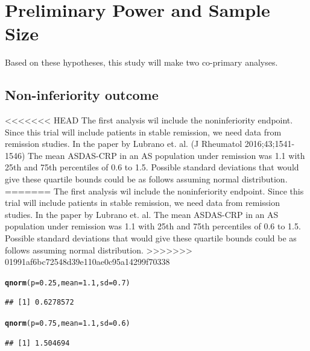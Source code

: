 \documentclass{article}\usepackage[]{graphicx}\usepackage[]{color}
\makeatletter
\newcommand{\hlnum}[1]{\textcolor[rgb]{0.686,0.059,0.569}{#1}}%
\newcommand{\hlstd}[1]{\textcolor[rgb]{0.345,0.345,0.345}{#1}}%
\newcommand{\hlkwc}[1]{\textcolor[rgb]{0.333,0.667,0.333}{#1}}%
\newcommand{\hlkwd}[1]{\textcolor[rgb]{0.737,0.353,0.396}{\textbf{#1}}}%
\newenvironment{kframe}{%
 \def\at@end@of@kframe{}%
 \ifinner\ifhmode%
  \def\at@end@of@kframe{\end{minipage}}%
  \begin{minipage}{\columnwidth}%
 \fi\fi%
 \def\FrameCommand##1{\hskip\@totalleftmargin \hskip-\fboxsep
 \colorbox{shadecolor}{##1}\hskip-\fboxsep
     \hskip-\linewidth \hskip-\@totalleftmargin \hskip\columnwidth}%
 \MakeFramed {\advance\hsize-\width
   \@totalleftmargin\z@ \linewidth\hsize
   \@setminipage}}%
 {\par\unskip\endMakeFramed%
 \at@end@of@kframe}
\newenvironment{knitrout}{}{} %
\makeatother
\begin{document}
\section{Preliminary Power and Sample Size}

Based on these hypotheses, this study will make two co-primary analyses.

\subsection{Non-inferiority outcome}
<<<<<<< HEAD
The first analysis wil include the noninferiority endpoint. Since this trial will include patients in stable remission, we need data from remission studies. In the paper by Lubrano et. al. (J Rheumatol 2016;43;1541-1546) The mean ASDAS-CRP in an AS population under remission was 1.1 with 25th and 75th percentiles of 0.6 to 1.5. Possible standard deviations that would give these quartile bounds could be as follows assuming normal distribution.
=======
The first analysis wil include the noninferiority endpoint. Since this trial will include patients in stable remission, we need data from remission studies. In the paper by Lubrano et. al. The mean ASDAS-CRP in an AS population under remission was 1.1 with 25th and 75th percentiles of 0.6 to 1.5. Possible standard deviations that would give these quartile bounds could be as follows assuming normal distribution.
>>>>>>> 01991af6bc72548d39e110ae0c95a14299f70338
\begin{knitrout}
\color{fgcolor}\begin{kframe}
\begin{alltt}
\hlkwd{qnorm}\hlstd{(}\hlkwc{p}\hlstd{=}\hlnum{0.25}\hlstd{,}\hlkwc{mean}\hlstd{=}\hlnum{1.1}\hlstd{,} \hlkwc{sd}\hlstd{=}\hlnum{0.7}\hlstd{)}
\end{alltt}
\begin{verbatim}
## [1] 0.6278572
\end{verbatim}
\begin{alltt}
\hlkwd{qnorm}\hlstd{(}\hlkwc{p}\hlstd{=}\hlnum{0.75}\hlstd{,}\hlkwc{mean}\hlstd{=}\hlnum{1.1}\hlstd{,} \hlkwc{sd}\hlstd{=}\hlnum{0.6}\hlstd{)}
\end{alltt}
\begin{verbatim}
## [1] 1.504694
\end{verbatim}
\end{kframe}
\end{knitrout}
\end{document}
